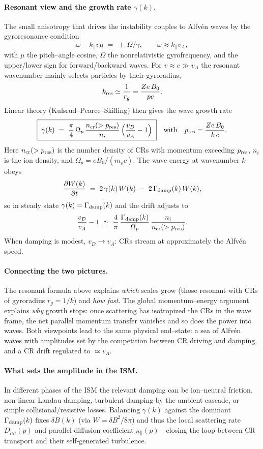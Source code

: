 \paragraph{Resonant view and the growth rate $\gamma(k)$.}
The small anisotropy that drives the instability couples to Alfv\'en waves by the gyroresonance condition
\[
\omega - k_\parallel v\mu \;=\; \pm \,\Omega/\gamma,
\qquad \omega \approx k_\parallel v_A,
\]
with $\mu$ the pitch–angle cosine, $\Omega$ the nonrelativistic gyrofrequency, and the upper/lower sign for forward/backward waves.
For $v\!\approx\!c\gg v_A$ the resonant wavenumber mainly selects particles by their gyroradius,
\[
k_{\rm res} \simeq \frac{1}{r_g}=\frac{Ze\,B_0}{pc}.
\]
Linear theory (Kulsrud–Pearce–Skilling) then gives the wave growth rate
\[
\boxed{\;
\gamma(k) \;=\; \frac{\pi}{4}\,\Omega_p\,
\frac{n_{\rm cr}(>p_{\rm res})}{n_i}\,
\Bigl(\frac{v_D}{v_A}-1\Bigr)
\;}
\quad\text{with}\quad
p_{\rm res}=\frac{Ze\,B_0}{k\,c}.
\]
Here $n_{\rm cr}(>p_{\rm res})$ is the number density of CRs with momentum exceeding $p_{\rm res}$, $n_i$ is the ion density, and $\Omega_p=eB_0/(m_pc)$.
The wave energy at wavenumber $k$ obeys
\[
\frac{\partial W(k)}{\partial t} \;=\; 2\,\gamma(k)\,W(k)\;-\;2\,\Gamma_{\rm damp}(k)\,W(k),
\]
so in steady state $\gamma(k)=\Gamma_{\rm damp}(k)$ and the drift adjusts to
\[
\frac{v_D}{v_A}-1\;\simeq\;
\frac{4}{\pi}\,\frac{\Gamma_{\rm damp}(k)}{\Omega_p}\,
\frac{n_i}{n_{\rm cr}(>p_{\rm res})}.
\]
When damping is modest, $v_D\!\to\! v_A$: CRs stream at approximately the Alfv\'en speed.

\paragraph{Connecting the two pictures.}
The resonant formula above explains \emph{which} scales grow (those resonant with CRs of gyroradius $r_g=1/k$) and \emph{how fast}. The global momentum–energy argument explains \emph{why} growth stops: once scattering has isotropized the CRs in the wave frame, the net parallel momentum transfer vanishes and so does the power into waves. Both viewpoints lead to the same physical end–state: a sea of Alfv\'en waves with amplitudes set by the competition between CR driving and damping, and a CR drift regulated to $\simeq v_A$.

\paragraph{What sets the amplitude in the ISM.}
In different phases of the ISM the relevant damping can be ion–neutral friction, non-linear Landau damping, turbulent damping by the ambient cascade, or simple collisional/resistive losses.
Balancing $\gamma(k)$ against the dominant $\Gamma_{\rm damp}(k)$ fixes $\delta B(k)$ (via $W=\delta B^2/8\pi$) and thus the local scattering rate $D_{\mu\mu}(p)$ and parallel diffusion coefficient $\kappa_\parallel(p)$—closing the loop between CR transport and their self-generated turbulence.

